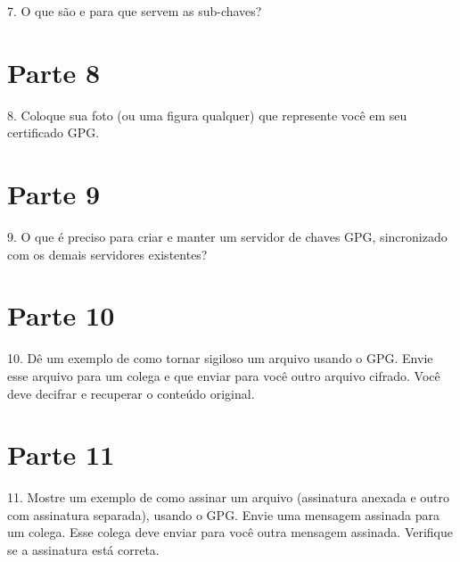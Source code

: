 \documentclass{article}
\begin{document}
    \begin{superframe}
        7. O que são e para que servem as sub-chaves?
    \end{superframe}

    \section{Parte 8}

    \begin{superframe}
        8. Coloque sua foto (ou uma figura qualquer) que represente você em seu
        certificado GPG\@.
    \end{superframe}

    \section{Parte 9}

    \begin{superframe}
        9. O que é preciso para criar e manter um servidor de chaves GPG,
        sincronizado com os demais servidores existentes?
    \end{superframe}

    \section{Parte 10}

    \begin{superframe}
        10. Dê um exemplo de como tornar sigiloso um arquivo usando o GPG\@.
        Envie esse arquivo para um colega e que enviar para você outro arquivo
        cifrado. Você deve decifrar e recuperar o conteúdo original.
    \end{superframe}

    \section{Parte 11}

    \begin{superframe}
        11. Mostre um exemplo de como assinar um arquivo (assinatura anexada e
        outro com assinatura separada), usando o GPG\@. Envie uma mensagem
        assinada para um colega. Esse colega deve enviar para você outra
        mensagem assinada. Verifique se a assinatura está correta.
    \end{superframe}
\end{document}
